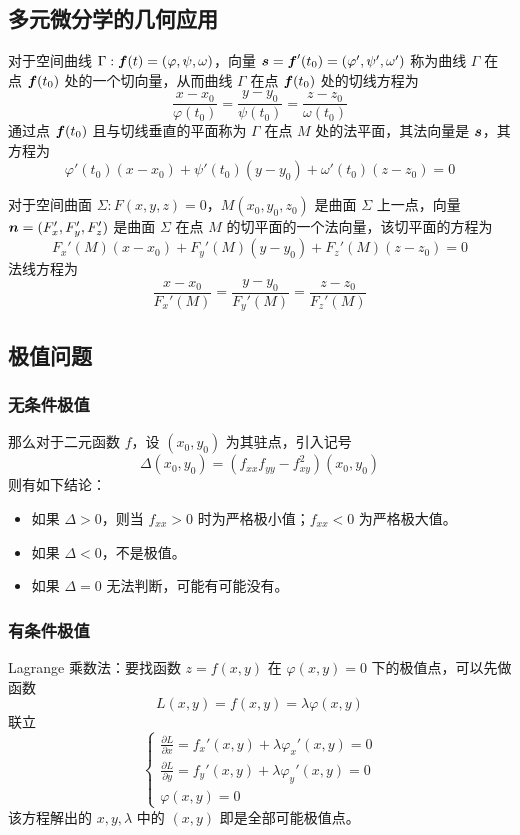 \subsection{多元微分学的几何应用}

对于空间曲线 $\Gamma: \boldsymbol{f}(t) = (\varphi, \psi, \omega)$，向量 $\boldsymbol{s} = \boldsymbol{f}'(t_0) = (\varphi', \psi', \omega')$ 称为曲线 $\Gamma$ 在点 $\boldsymbol{f}(t_0)$ 处的一个切向量，从而曲线 $\Gamma$ 在点 $\boldsymbol{f}(t_0)$ 处的切线方程为
\[ \frac{x - x_0}{\varphi(t_0)} = \frac{y - y_0}{\psi(t_0)} = \frac{z - z_0}{\omega(t_0)} \]
通过点 $\boldsymbol{f}(t_0)$ 且与切线垂直的平面称为 $\Gamma$ 在点 $M$ 处的法平面，其法向量是 $\boldsymbol{s}$，其方程为
\[ \varphi'(t_0)(x - x_0) + \psi'(t_0)(y - y_0) + \omega'(t_0)(z - z_0) = 0 \]

对于空间曲面 $\Sigma: F(x, y, z) = 0$，$M(x_0, y_0, z_0)$ 是曲面 $\Sigma$ 上一点，向量 $\boldsymbol{n} = (F_x', F_y', F_z')$ 是曲面 $\Sigma$ 在点 $M$ 的切平面的一个法向量，该切平面的方程为
\[ F_x'(M)(x-x_0) + F_y'(M) (y-y_0) + F_z'(M) (z- z_0) = 0 \]
法线方程为
\[ \frac{x - x_0}{F_x'(M)} = \frac{y - y_0}{F_y'(M)} = \frac{z - z_0}{F_z'(M)} \]

\subsection{极值问题}

\subsubsection*{无条件极值}

那么对于二元函数 $f$，设 $(x_0, y_0)$ 为其驻点，引入记号
\[ \Delta(x_0, y_0) = (f_{xx} f_{yy} - f_{xy}^2)(x_0, y_0) \]
则有如下结论：
\begin{itemize}
	\item 如果 $\Delta > 0$，则当 $f_{xx} > 0$ 时为严格极小值；$f_{xx} < 0$ 为严格极大值。
	\item 如果 $\Delta < 0$，不是极值。
	\item 如果 $\Delta = 0$ 无法判断，可能有可能没有。
\end{itemize}

\subsubsection*{有条件极值}

Lagrange 乘数法：要找函数 $z = f(x, y)$ 在 $\varphi(x, y) = 0$ 下的极值点，可以先做函数
\[ L(x, y) = f(x, y) = \lambda \varphi(x, y) \]
联立
\[ \begin{cases}
		\frac{\partial L}{\partial x} = f_x'(x,y) + \lambda \varphi_x'(x, y) = 0 \\
		\frac{\partial L}{\partial y} = f_y'(x,y) + \lambda \varphi_y'(x, y) = 0 \\
		\varphi(x, y) = 0
	\end{cases} \]
该方程解出的 $x, y, \lambda$ 中的 $(x, y)$ 即是全部可能极值点。


